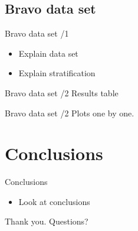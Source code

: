 \documentclass{beamer}
\begin{document}
\subsection{Bravo data set}

\begin{frame}{Bravo data set /1}
\begin{itemize}
\item Explain data set
\item Explain stratification
\end{itemize}
\end{frame}

\begin{frame}{Bravo data set /2}
Results table
\end{frame}

\begin{frame}{Bravo data set /2}
Plots one by one.
\end{frame}

\section{Conclusions}

\begin{frame}{Conclusions}
\begin{itemize}
\item Look at conclusions
\end{itemize}
\end{frame}

\begin{frame}
Thank you. Questions?
\end{frame}
\end{document}
